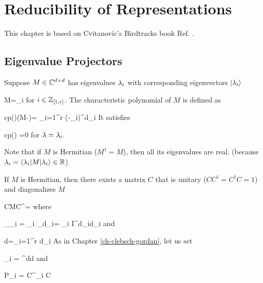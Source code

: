 \chapter{Reducibility of Representations}
\label{ch-reducibility}

This chapter is based on Cvitanovic's Birdtracks book Ref. \cite{birdtracks-book}.

\section{Eigenvalue Projectors}

Suppose $M\in { \mathbb{C}}^{d\times d }$ 
has eigenvalues 
$\lambda_i$ with corresponding eigenvectors $|\lambda_i\rangle$

\beq
M=\lam_i 
\eeq
for $i\in {\mathbb{Z}}_{[1,r]}$.
The characteristic polynomial of $M$ is
defined as

\beq
cp(\lam)\eqdef \det(M-\lam)= \prod_{i=1}^r (\lam-\lam_i)^{d_i}
\eeq
It satisfies

\beq
cp(\lam) =0
\eeq
for $\lambda=\lambda_i$.

Note 
that if $M$ is Hermitian 
($M^\dagger=M$),
then all its eigenvalues  are real. (because $\lambda_i =
\left\langle\lambda_i|M|\lambda_i\right\rangle\in{ \mathbb{R}}$)




If $M$ is Hermitian, then there exists
a matrix $C$ that is unitary  ($CC^\dagger = C^\dagger C =1$)
and diagonalizes $M$

\beq
CMC^\dagger=
\eeq
where

\beq
\Lam_{\lam_i} =
\lam_i
_{d_i}=
\lam_i I^{d_i\times d_i}
\eeq
and

\beq
d=\sum_{i=1}^r d_i
\eeq
As in Chapter \ref{ch-clebsch-gordan},
let us set 

\beq
\pi_{i}  = 
^{d\times d}
\eeq
and

\beq 
P_i = C^\dagger\pi_i C
\eeq


